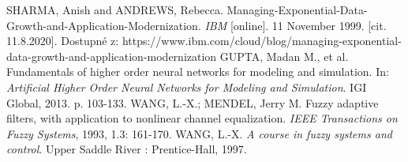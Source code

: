 \documentclass[11pt,twoside,openright]{report}
\begin{document}
\begin{thebibliography}{L}
SHARMA, Anish and ANDREWS, Rebecca. Managing-Exponential-Data-Growth-and-Application-Modernization. \textit{IBM} [online]. 11 November 1999. [cit. 11.8.2020]. Dostupné z: https://www.ibm.com/cloud/blog/managing-exponential-data-growth-and-application-modernization 
GUPTA, Madan M., et al. Fundamentals of higher order neural networks for modeling and simulation. In: \textit{Artificial Higher Order Neural Networks for Modeling and Simulation}. IGI Global, 2013. p. 103-133.
WANG, L.-X.; MENDEL, Jerry M. Fuzzy adaptive filters, with application to nonlinear channel equalization. \textit{IEEE Transactions on Fuzzy Systems}, 1993, 1.3: 161-170.
WANG, L.-X. \textit{A course in fuzzy systems and control}. Upper Saddle River : Prentice-Hall, 1997.
\end{thebibliography}



\clearpage
{}
\end{document}
